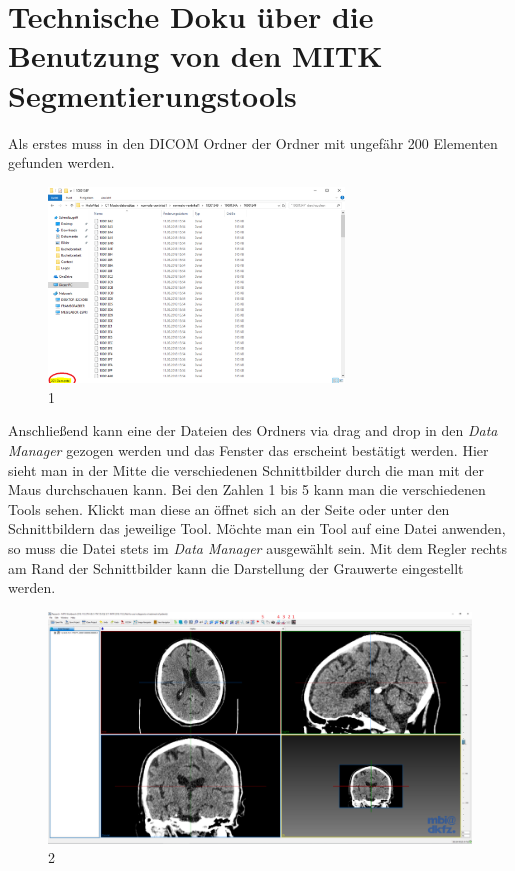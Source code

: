
\Appendix
\label{ch:Appendix}



\section{Technische Doku über die Benutzung von den MITK Segmentierungstools}

Als erstes muss in den DICOM Ordner der Ordner mit ungefähr 200 Elementen gefunden werden.

\begin{figure}[H] 
\centering 
\includegraphics[width=0.7\textwidth]{Logos/MITK_Doku/1.PNG}
\caption{1} 
\label{fig:eins} 
\end{figure}

Anschließend kann eine der Dateien des Ordners via drag and drop in den \textit{Data Manager} gezogen werden und das Fenster das erscheint bestätigt werden.
\newline
Hier sieht man in der Mitte die verschiedenen Schnittbilder durch die man mit der Maus durchschauen kann.
\newline
Bei den Zahlen 1 bis 5 kann man die verschiedenen Tools sehen. Klickt man diese an öffnet sich an der Seite oder unter den Schnittbildern das jeweilige Tool. Möchte man ein Tool auf eine Datei anwenden, so muss die Datei stets im \textit{Data Manager} ausgewählt sein.
\newline
Mit dem Regler rechts am Rand der Schnittbilder kann die Darstellung der Grauwerte eingestellt werden.

\begin{figure}[H] 
\centering 
\includegraphics[width=\textwidth]{Logos/MITK_Doku/2.PNG}
\caption{2} 
\label{fig:zwei} 
\end{figure}

